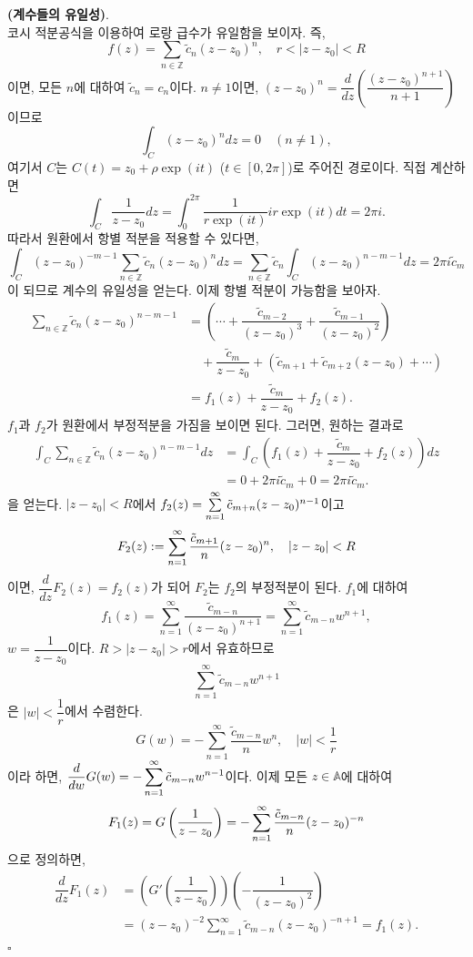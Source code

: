 {\bf (계수들의 유일성)}. \\[1ex]
코시 적분공식을 이용하여 로랑 급수가 유일함을 보이자. 즉,
\[
f(z) = \sum_{n\in\mathbb Z} \tilde c_n(z-z_0)^n, \quad
r < |z-z_0| <R
\]
이면, 모든 $n$에 대하여 $\tilde c_n = c_n$이다.
$n\ne 1$이면, $(z-z_0)^n = \dfrac d{dz} \left( \dfrac{(z-z_0)^{n+1}}{n+1} \right)$이므로
\[
\int_C (z-z_0)^n dz = 0 \quad (n\ne1),
\]
여기서 $C$는 $C(t)=z_0 + \rho\exp(it)$ ($t\in[0,2\pi]$)로 주어진 경로이다.
직접 계산하면
\[
\int_C \dfrac1{z-z_0} dz = \int_0^{2\pi} \dfrac1{r\exp(it)}ir\exp(it)dt = 2\pi i.
\]
따라서 원환에서 항별 적분을 적용할 수 있다면,
\[
\int_C (z-z_0)^{-m-1} \sum_{n\in\mathbb Z} \tilde c_n (z-z_0)^n dz
= \sum_{n\in\mathbb Z} \tilde c_n \int_C (z-z_0)^{n-m-1} dz = 2\pi i \tilde c_m
\]
이 되므로 계수의 유일성을 얻는다.
이제 항별 적분이 가능함을 보아자.
\begin{align*}
 \sum_{n\in\mathbb Z} \tilde c_n (z-z_0)^{n-m-1}
 &= \left( \cdots + \dfrac{\tilde c_{m-2}}{(z-z_0)^3} +  \dfrac{\tilde c_{m-1}}{(z-z_0)^2} \right) \\
 & \quad + \dfrac{\tilde c_m}{z-z_0} + (\tilde c_{m+1} + \tilde c_{m+2}(z-z_0) + \cdots) \\
 & = f_1(z) + \dfrac{\tilde c_m}{z-z_0} + f_2(z).
\end{align*}
$f_1$과 $f_2$가 원환에서 부정적분을 가짐을 보이면 된다. 그러면, 원하는 결과로
\begin{align*}
\int_C  \sum_{n\in\mathbb Z} \tilde c_n (z-z_0)^{n-m-1} dz
&= \int_C \left( f_1(z) + \dfrac{\tilde c_m}{z-z_0} + f_2(z) \right) dz \\
&= 0 + 2\pi i \tilde c_m + 0 = 2\pi i \tilde c_m.
\end{align*}
을 얻는다.
$|z-z_0|<R$에서 $f_2(z) = \sum\limits_{n=1}^\infty \tilde c_{m+n} (z-z_0)^{n-1}$이고
\[
F_2(z) := \sum\limits_{n=1}^\infty \displaystyle\frac{\tilde c_{m+1}}n (z-z_0)^n,
\quad |z-z_0|<R
\]
이면, $\dfrac d{dz} F_2(z) = f_2(z)$가 되어 $F_2$는 $f_2$의 부정적분이 된다.
$f_1$에 대하여 
\[
f_1(z) = \sum_{n=1}^\infty \dfrac{\tilde c_{m-n}}{(z-z_0)^{n+1}} 
= \sum_{n=1}^\infty \tilde c_{m-n} w^{n+1},
\]
$w = \dfrac1{z-z_0}$이다. $R>|z-z_0| >r$에서 유효하므로
\[
\sum_{n=1}^\infty \tilde c_{m-n} w^{n+1}
\]
은 $|w|<\dfrac1r$에서 수렴한다. 
\[
G(w) = - \sum_{n=1}^\infty \dfrac{\tilde c_{m-n}}n w^n,\quad
|w|<\dfrac1r
\]
이라 하면, $\displaystyle\frac d{dw} G(w) = - \sum\limits_{n=1}^\infty \tilde c_{m-n} w^{n-1}$이다. 
이제 모든 $z\in \mathbb A$에 대하여
\[
F_1(z) = G\left(\displaystyle\frac1{z-z_0}\right) 
= - \sum\limits_{n=1}^\infty\displaystyle\frac{\tilde c_{m-n}}n (z-z_0)^{-n}
\]
으로 정의하면,
\begin{align*}
\dfrac d{dz} F_1(z)
&= \left( G'\left(\dfrac1{z-z_0}\right)\right) \left(- \dfrac1{(z-z_0)^2}\right) \\
&= (z-z_0)^{-2} \sum_{n=1}^\infty \tilde c_{m-n} (z-z_0)^{-n+1} = f_1(z).
\end{align*}
\hfill $\square$

